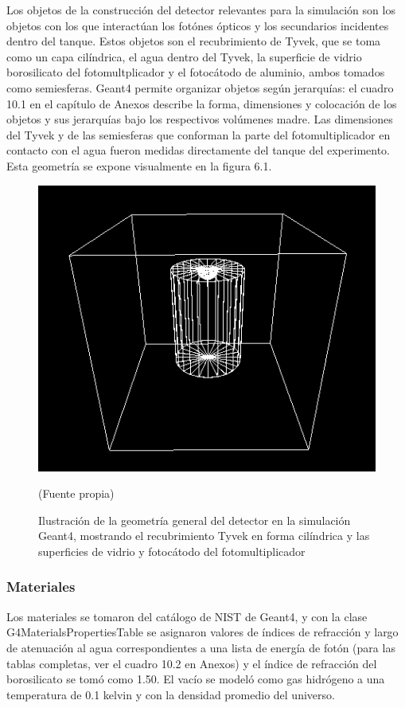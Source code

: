 \documentclass{book}
\begin{document}
Los objetos de la construcci\'on del detector relevantes para la simulaci\'on son los objetos con los que interact\'uan los fot\'ones \'opticos y los secundarios incidentes dentro del tanque. Estos objetos son el recubrimiento de Tyvek, que se toma como un capa cil\'indrica, el agua dentro del Tyvek, la superficie de vidrio borosilicato del fotomultplicador y el fotoc\'atodo de aluminio, ambos tomados como semiesferas. Geant4 permite organizar objetos seg\'un jerarqu\'ias: el cuadro 10.1 en el cap\'itulo de Anexos describe la forma, dimensiones y colocaci\'on de los objetos y sus jerarqu\'ias bajo los respectivos vol\'umenes madre. Las dimensiones del Tyvek y de las semiesferas que conforman la parte del fotomultiplicador en contacto con el agua fueron medidas directamente del tanque del experimento. Esta geometr\'ia se expone visualmente en la figura 6.1.

\begin{figure}[h] %
\begin{center}
 \includegraphics[width = 0.8\linewidth]{GeometriaG4.png}
 
(Fuente propia)
\caption{Ilustraci\'on de la geometr\'ia general del detector en la simulaci\'on Geant4, mostrando el recubrimiento Tyvek en forma cil\'indrica y las superficies de vidrio y fotoc\'atodo del fotomultiplicador}
\end{center}
\end{figure}

\subsubsection{Materiales}
Los materiales se tomaron del cat\'alogo de NIST de Geant4, y con la clase G4MaterialsPropertiesTable se asignaron valores de \'indices de refracci\'on y largo de atenuaci\'on al agua correspondientes a una lista de energ\'ia de fot\'on (para las tablas completas, ver el cuadro 10.2 en Anexos) y el \'indice de refracci\'on del borosilicato se tom\'o como 1.50. El vac\'io se model\'o como gas hidr\'ogeno a una temperatura de 0.1 kelvin y con la densidad promedio del universo.
\end{document}
